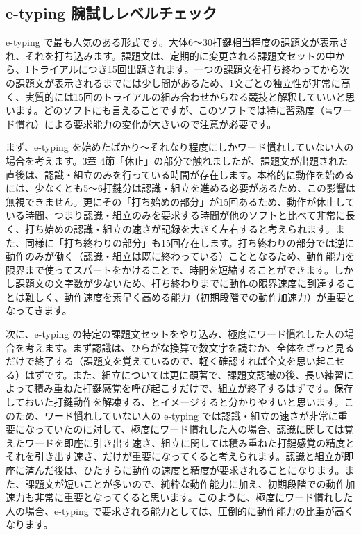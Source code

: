 \subsection{e-typing 腕試しレベルチェック}

e-typing で最も人気のある形式です。大体6～30打鍵相当程度の課題文が表示され、それを打ち込みます。課題文は、定期的に変更される課題文セットの中から、1トライアルにつき15回出題されます。一つの課題文を打ち終わってから次の課題文が表示されるまでには少し間があるため、1文ごとの独立性が非常に高く、実質的には15回のトライアルの組み合わせからなる競技と解釈していいと思います。どのソフトにも言えることですが、このソフトでは特に習熟度（≒ワード慣れ）による要求能力の変化が大きいので注意が必要です。

まず、e-typing を始めたばかり～それなり程度にしかワード慣れしていない人の場合を考えます。3章 4節「休止」の部分で触れましたが、課題文が出題された直後は、認識・組立のみを行っている時間が存在します。本格的に動作を始めるには、少なくとも5～6打鍵分は認識・組立を進める必要があるため、この影響は無視できません。更にその「打ち始めの部分」が15回あるため、動作が休止している時間、つまり認識・組立のみを要求する時間が他のソフトと比べて非常に長く、打ち始めの認識・組立の速さが記録を大きく左右すると考えられます。また、同様に「打ち終わりの部分」も15回存在します。打ち終わりの部分では逆に動作のみが働く（認識・組立は既に終わっている）こととなるため、動作能力を限界まで使ってスパートをかけることで、時間を短縮することができます。しかし課題文の文字数が少ないため、打ち終わりまでに動作の限界速度に到達することは難しく、動作速度を素早く高める能力（初期段階での動作加速力）が重要となってきます。

次に、e-typing の特定の課題文セットをやり込み、極度にワード慣れした人の場合を考えます。まず認識は、ひらがな換算で数文字を読むか、全体をざっと見るだけで終了する（課題文を覚えているので、軽く確認すれば全文を思い起こせる）はずです。また、組立については更に顕著で、課題文認識の後、長い練習によって積み重ねた打鍵感覚を呼び起こすだけで、組立が終了するはずです。保存しておいた打鍵動作を解凍する、とイメージすると分かりやすいと思います。このため、ワード慣れしていない人の e-typing では認識・組立の速さが非常に重要になっていたのに対して、極度にワード慣れした人の場合、認識に関しては覚えたワードを即座に引き出す速さ、組立に関しては積み重ねた打鍵感覚の精度とそれを引き出す速さ、だけが重要になってくると考えられます。認識と組立が即座に済んだ後は、ひたすらに動作の速度と精度が要求されることになります。また、課題文が短いことが多いので、純粋な動作能力に加え、初期段階での動作加速力も非常に重要となってくると思います。このように、極度にワード慣れした人の場合、e-typing で要求される能力としては、圧倒的に動作能力の比重が高くなります。

